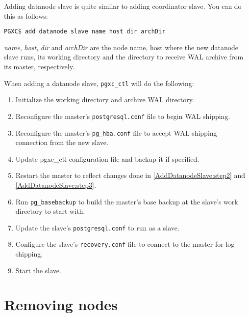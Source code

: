   Adding datanode slave is quite similar to adding coordinator slave.
  You can do this as follows:
  
  \begin{lstlisting}[frame=single]
PGXC$ add datanode slave name host dir archDir
  \end{lstlisting}
  
  {\it name}, {\it host}, {\it dir} and {\it archDir} are the node name, host where the new
  datanode slave runs, its working directory and the directory to receive WAL archive from
  its master, respectively.
  
  When adding a datanode slave, \verb|pgxc_ctl| will do the following:
  
  \begin{enumerate}
	  \item Initialize the working directory and archive WAL directory.
	  \item \label{AddDatanodeSlave:step2}Reconfigure the master's \verb|postgresql.conf|
	  		file to begin WAL shipping.
	  \item \label{AddDatanodeSlave:step3}Reconfigure the master's \verb|pg_hba.conf| file
	  		to accept WAL shipping connection from the new slave.
	  \item Update pgxc\_ctl configuration file and backup it if specified.
	  \item Restart the master to reflect changes done in \ref{AddDatanodeSlave:step2} and
	  		\ref{AddDatanodeSlave:step3}.
	  \item Run \verb|pg_basebackup| to build the master's base backup at the slave's work
	  		directory to start with.
	  \item Update the slave's \verb|postgresql.conf| to run as a slave.
	  \item Configure the slave's \verb|recovery.conf| file to connect to the master for
	  		log shipping.
	  \item Start the slave.
  \end{enumerate}




%
%
\chapter{Removing nodes}

